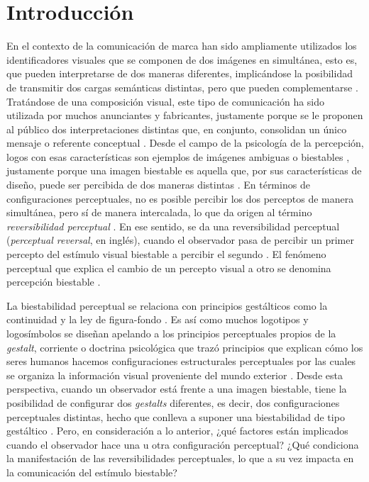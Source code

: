 \documentclass[spanish]{textolivre}
\begin{document}
\section{Introducción}
En el contexto de la comunicación de marca han sido ampliamente utilizados los identificadores visuales que se componen de dos imágenes en simultánea, esto es, que pueden interpretarse de dos maneras diferentes, implicándose la posibilidad de transmitir dos cargas semánticas distintas, pero que pueden complementarse \cite{gonzalez_de_cosio_rhetoric_1998}. Tratándose de una composición visual, este tipo de comunicación ha sido utilizada por muchos anunciantes y fabricantes, justamente porque se le proponen al público dos interpretaciones distintas que, en conjunto, consolidan un único mensaje o referente conceptual \cite{oconnor_colour_2015}. Desde el campo de la psicología de la percepción, logos  con esas características son ejemplos de imágenes ambiguas o biestables \cite{rodriguez-martinez_can_2024}, justamente porque una imagen biestable es aquella que, por sus características de diseño, puede ser percibida de dos maneras distintas \cite{rodriguez-martinez_bistable_2018}. En términos de configuraciones perceptuales, no es posible percibir los dos perceptos de manera simultánea, pero sí de manera intercalada, lo que da origen al término \textit{reversibilidad perceptual} \cite{brancucci_independent_2020,leopold_multistable_1999}. En ese sentido, se da una reversibilidad perceptual (\textit{perceptual reversal}, en inglés), cuando el observador pasa de percibir un primer percepto del estímulo visual biestable a percibir el segundo \cite{marroquin-ciendua_modulacion_2020}. El fenómeno perceptual que explica el cambio de un percepto visual a otro se denomina percepción biestable \cite{leopold_multistable_1999,long_enduring_2004,weilnhammer_bistable_2021}.

La biestabilidad perceptual se relaciona con principios gestálticos como la continuidad y la ley de figura-fondo \cite{cao_independent_2018,kogo_temporal_2015}. Es así como muchos logotipos y logosímbolos se diseñan apelando a los principios perceptuales propios de la \textit{gestalt}, corriente o doctrina psicológica que trazó principios que explican cómo los seres humanos hacemos configuraciones estructurales perceptuales por las cuales se organiza la información visual proveniente del mundo exterior \cite{lee_influence_2012}. Desde esta perspectiva, cuando un observador está frente a una imagen biestable, tiene la posibilidad de configurar dos \textit{gestalts} diferentes, es decir, dos configuraciones perceptuales distintas, hecho que conlleva a suponer una biestabilidad de tipo gestáltico \cite{de-wit_bistable_2012}. Pero, en consideración a lo anterior, ¿qué factores están implicados cuando el observador hace una u otra configuración perceptual? ¿Qué condiciona la manifestación de las reversibilidades perceptuales, lo que a su vez impacta en la comunicación del estímulo biestable?
\end{document}
